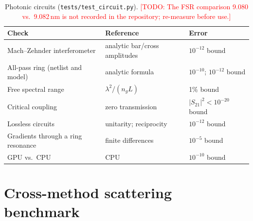\documentclass[11pt]{article}
\newcommand{\todo}[1]{\textcolor{red}{[TODO: #1]}}
\newcommand{\code}[1]{\texttt{#1}}
\begin{document}
\begin{table}[ht]
\centering\small
\begin{tabularx}{\linewidth}{@{}Xll@{}}
\toprule
Check & Reference & Error \\
\midrule
Mach--Zehnder interferometer & analytic bar/cross amplitudes & $10^{-12}$ bound \\
All-pass ring (netlist and model) & analytic formula & $10^{-10}$; $10^{-12}$ bound \\
Free spectral range & $\lambda^2/(n_g L)$ & 1\% bound \\
Critical coupling & zero transmission & $|S_{21}|^2<10^{-20}$ bound \\
Lossless circuits & unitarity; reciprocity & $10^{-12}$ bound \\
Gradients through a ring resonance & finite differences & $10^{-5}$ bound \\
GPU vs.\ CPU & CPU & $10^{-10}$ bound \\
\bottomrule
\end{tabularx}
\caption{Photonic circuits (\code{tests/test\_circuit.py}). \todo{The FSR comparison 9.080 vs.\
9.082\,nm is not recorded in the repository; re-measure before use.}}
\label{tab:val-circuit}
\end{table}

\section{Cross-method scattering benchmark}
\label{sec:bench}
\end{document}

